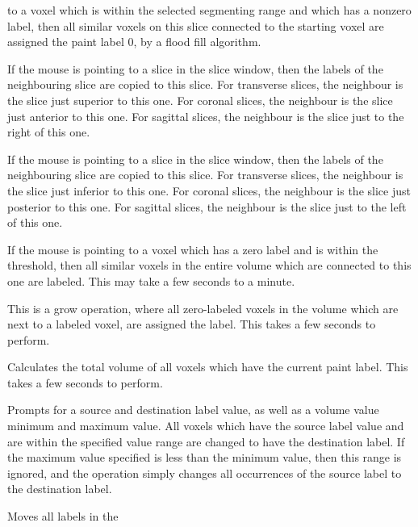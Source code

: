 \begin{description}
    to a voxel which is within the selected segmenting range and which
    has a nonzero label, then all similar voxels on this slice connected
    to the starting voxel are assigned the paint label 0, by a
    flood fill algorithm.
\item[\menutwo{Segmenting}{Copy from Rt/Sup/Ant}]  If the mouse is
    pointing to a slice in the slice window, then the labels of the
    neighbouring slice are copied to this slice.
    For transverse
    slices, the neighbour is the slice just superior to this one.
    For coronal
    slices, the neighbour is the slice just anterior to this one.
    For sagittal
    slices, the neighbour is the slice just to the right of this one.
\item[\menutwo{Segmenting}{Copy from Lt/Inf/Pos}]  If the mouse is
    pointing to a slice in the slice window, then the labels of the
    neighbouring slice are copied to this slice.
    For transverse
    slices, the neighbour is the slice just inferior to this one.
    For coronal
    slices, the neighbour is the slice just posterior to this one.
    For sagittal
    slices, the neighbour is the slice just to the left of this one.
\item[\menutwo{Segmenting}{Fill 3D}]  If the mouse is pointing to a
    voxel which has a zero label and is within the threshold, then
    all similar voxels in the entire volume which are connected to
    this one are labeled.  This may take a few seconds to a minute.
\item[\menutwo{Segmenting}{Expand 3D}]  This is a grow operation,
    where all zero-labeled voxels in the volume which are next to
    a labeled voxel, are assigned the label.  This takes a few
    seconds to perform.
\item[\menutwo{Segmenting}{Calculate Volume}]  Calculates the
    total volume of all voxels which have the current paint label.
    This takes a few seconds to perform.
\item[\menutwo{Segmenting}{Change Labels}]  Prompts for a source
    and destination label value, as well as a volume value minimum and
    maximum value.  All voxels which have the source label value and
    are within the specified value range are changed to have the
    destination label.  If the maximum value specified is less than
    the minimum value, then this range is ignored, and the operation
    simply changes all occurrences of the source label to the
    destination label.
\item[\menutwo{Segmenting}{Trans \^\ }]  Moves all labels in the

\end{description}
